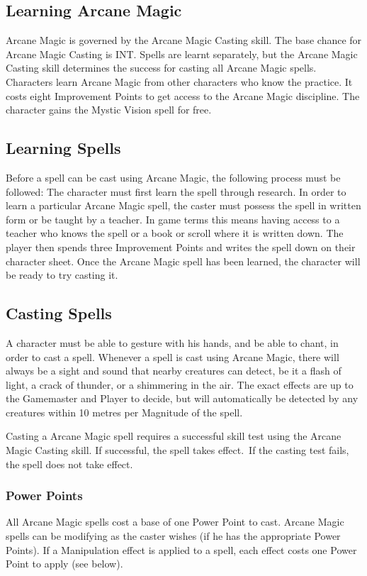 \subsection{Learning Arcane Magic}
Arcane Magic is governed by the Arcane Magic Casting skill. The base chance for Arcane Magic Casting is INT. Spells are learnt separately, but the Arcane Magic Casting skill determines the success for casting all Arcane Magic spells. Characters learn Arcane Magic from other characters who know the practice. It costs eight Improvement Points to get access to the Arcane Magic discipline. The character gains the Mystic Vision spell for free.

\subsection{Learning Spells}
Before a spell can be cast using Arcane Magic, the following process must be followed:
The character must first learn the spell through research. In order to learn a particular Arcane Magic spell, the caster must possess the spell in written form or be taught by a teacher. In game terms this means having access to a teacher who knows the spell or a book or scroll where it is written down. The player then spends three Improvement Points and writes the spell down on their character sheet. Once the Arcane Magic spell has been learned, the character will be ready to try casting it.



\subsection{Casting Spells}
A character must be able to gesture with his hands, and be able to chant, in order to cast a spell. Whenever a spell is cast using Arcane Magic, there will always be a sight and sound that nearby creatures can detect, be it a flash of light, a crack of thunder, or a shimmering in the air. The exact effects are up to the Gamemaster and Player to decide, but will automatically be detected by any creatures within 10 metres per Magnitude of the spell. 

Casting a Arcane Magic spell requires a successful skill test using the Arcane Magic Casting skill. If successful, the spell takes effect. If the casting test fails, the spell does not take effect. 

\subsubsection{Power Points}
All Arcane Magic spells cost a base of one Power Point to cast. Arcane Magic spells can be modifying as the caster wishes (if he has the appropriate Power Points). If a Manipulation effect is applied to a spell, each effect costs one Power Point to apply (see below). 

